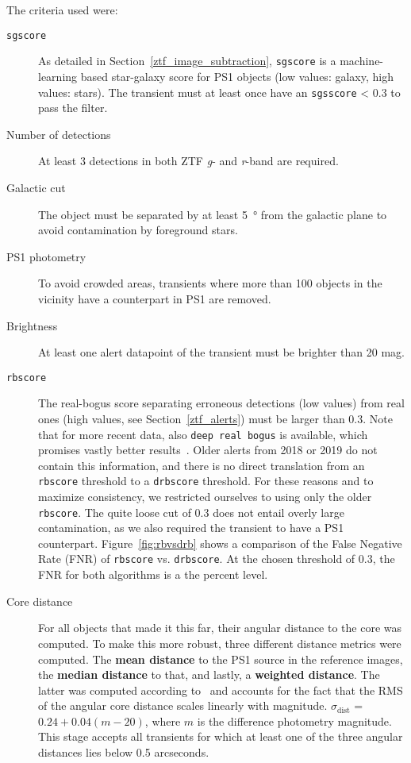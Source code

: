 The criteria used were:
\begin{description}
  \item[\texttt{sgscore}] As detailed in Section~\ref{ztf_image_subtraction}, \texttt{sgscore} is a machine-learning based star-galaxy score for PS1 objects (low values: galaxy, high values: stars). The transient must at least once have an \texttt{sgsscore} < 0.3 to pass the filter.
  \item[Number of detections] At least 3 detections in both ZTF \textit{g}- and \textit{r}-band are required.
  \item[Galactic cut] The object must be separated by at least \SI{5}{\degree} from the galactic plane to avoid contamination by foreground stars.
  \item[PS1 photometry] To avoid crowded areas, transients where more than 100 objects in the vicinity have a counterpart in PS1 are removed.
  \item[Brightness] At least one alert datapoint of the transient must be brighter than 20 mag.
  \item[\texttt{rbscore}] The real-bogus score separating erroneous detections (low values) from real ones (high values, see Section~\ref{ztf_alerts}) must be larger than 0.3. Note that for more recent data, also \texttt{deep real bogus} is available, which promises vastly better results~. Older alerts from 2018 or 2019 do not contain this information, and there is no direct translation from an \texttt{rbscore} threshold to a \texttt{drbscore} threshold. For these reasons and to maximize consistency, we restricted ourselves to using only the older \texttt{rbscore}. The quite loose cut of 0.3 does not entail overly large contamination, as we also required the transient to have a PS1 counterpart. Figure~\ref{fig:rbvsdrb} shows a comparison of the False Negative Rate (FNR) of \texttt{rbscore} vs. \texttt{drbscore}. At the chosen threshold of $0.3$, the FNR for both algorithms is a the percent level.
  \item[Core distance] For all objects that made it this far, their angular distance to the core was computed. To make this more robust, three different distance metrics were computed. The \textbf{mean distance} to the PS1 source in the reference images, the \textbf{median distance} to that, and lastly, a \textbf{weighted distance}. The latter was computed according to~ and accounts for the fact that the RMS of the angular core distance scales linearly with magnitude. $\sigma_\text{dist}$ = $0.24 + 0.04(m-20)$, where $m$ is the difference photometry magnitude. This stage accepts all transients for which at least one of the three angular distances lies below 0.5 arcseconds.
\end{description}


